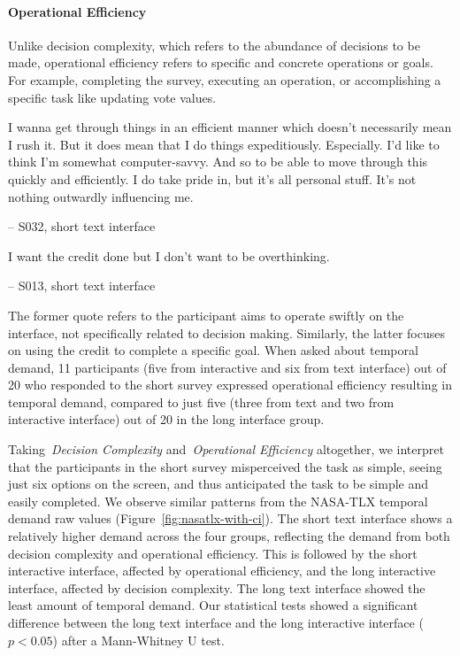 \paragraph{Operational Efficiency}
Unlike decision complexity, which refers to the abundance of decisions to be made, operational efficiency refers to specific and concrete operations or goals. For example, completing the survey, executing an operation, or accomplishing a specific task like updating vote values.

\begin{displayquote}
I wanna get through things in an efficient manner which doesn't necessarily mean I rush it. But it does mean that I do things expeditiously. Especially. I'd like to think I'm somewhat computer-savvy. And so to be able to move through this quickly and efficiently. I do take pride in, but it's all personal stuff. It's not nothing outwardly influencing me. 
        
\noindent \hfill -- S032, short text interface
\end{displayquote}

\begin{displayquote}
I want the credit done but I don't want to be overthinking.
            
\noindent \hfill -- S013, short text interface
\end{displayquote}

The former quote refers to the participant aims to operate swiftly on the interface, not specifically related to decision making. Similarly, the latter focuses on using the credit to complete a specific goal. When asked about temporal demand, 11 participants (five from interactive and six from text interface) out of 20 who responded to the short survey expressed operational efficiency resulting in temporal demand, compared to just five (three from text and two from interactive interface) out of 20 in the long interface group.

Taking~\textit{Decision Complexity} and~\textit{Operational Efficiency} altogether, we interpret that the participants in the short survey misperceived the task as simple, seeing just six options on the screen, and thus anticipated the task to be simple and easily completed. We observe similar patterns from the NASA-TLX temporal demand raw values (Figure~\ref{fig:nasatlx-with-ci}). The short text interface shows a relatively higher demand across the four groups, reflecting the demand from both decision complexity and operational efficiency. This is followed by the short interactive interface, affected by operational efficiency, and the long interactive interface, affected by decision complexity. The long text interface showed the least amount of temporal demand. Our statistical tests showed a significant difference between the long text interface and the long interactive interface ($p<0.05$) after a Mann-Whitney U test.

